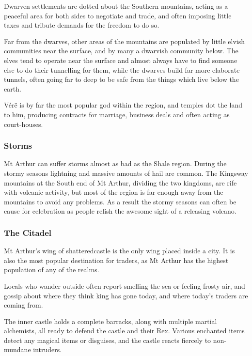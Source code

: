 \begin{multicols}{2}
Dwarven settlements are dotted about the Southern mountains, acting as a peaceful area for both sides to negotiate and trade, and often imposing little taxes and tribute demands for the freedom to do so.

Far from the dwarves, other areas of the mountains are populated by little elvish communities near the surface, and by many a dwarvish community below.  The elves tend to operate near the surface and almost always have to find someone else to do their tunnelling for them, while the dwarves build far more elaborate tunnels, often going far to deep to be safe from the things which live below the earth.

V\'{e}r\"{e} is by far the most popular god within the region, and temples dot the land to him, producing contracts for marriage, business deals and often acting as court-houses.

\subsubsection{Storms}

Mt Arthur can suffer storms almost as bad as the Shale region.
During the stormy seasons lightning and massive amounts of hail are common.
The Kingsway mountains at the South end of Mt Arthur, dividing the two kingdoms, are rife with volcanic activity, but most of the region is far enough away from the mountains to avoid any problems.
As a result the stormy seasons can often be cause for celebration as people relish the awesome sight of a releasing volcano.

\subsubsection{The Citadel}

Mt Arthur's wing of \gls{shatteredcastle} is the only wing placed inside a city.
It is also the most popular destination for traders, as Mt Arthur has the highest population of any of the realms.

Locals who wander outside often report smelling the sea or feeling frosty air, and gossip about where they think \gls{king} has gone today, and where today's traders are coming from.

The inner castle holds a complete barracks, along with multiple martial alchemists, all ready to defend the castle and their Rex.
Various enchanted items detect any magical items or disguises, and the castle reacts fiercely to non-mundane intruders.


\end{multicols}
